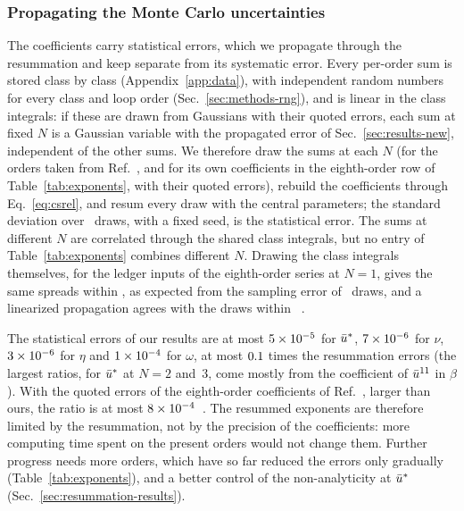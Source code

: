 \subsubsection{Propagating the Monte Carlo uncertainties}
\label{sec:resummation-errors}

The coefficients carry statistical errors, which we propagate through the resummation and keep separate from its
systematic error. Every per-order sum is stored class by class (Appendix~\ref{app:data}), with independent random
numbers for every class and loop order (Sec.~\ref{sec:methods-rng}), and is linear in the class integrals: if these
are drawn from Gaussians with their quoted errors, each sum at fixed $N$ is a Gaussian variable with the propagated
error of Sec.~\ref{sec:results-new}, independent of the other sums. We therefore draw the sums at each $N$ (for the
orders taken from Ref.~\cite{Phi4tools2024}, and for its own coefficients in the eighth-order row of
Table~\ref{tab:exponents}, with their quoted errors), rebuild the coefficients through Eq.~\eqref{eq:csrel}, and resum
every draw with the central parameters; the standard deviation over \rsDraws\ draws, with a fixed seed, is the
statistical error. The sums at different $N$ are correlated through the shared class integrals, but no entry of
Table~\ref{tab:exponents} combines different $N$. Drawing the class integrals themselves, for the ledger inputs of the
eighth-order series at $N=1$, gives the same spreads within \rsClassDev, as expected from the sampling error of
\rsDraws\ draws, and a linearized propagation agrees with the draws within \rsLinDev~.

The statistical errors of our results are at most $5\times10^{-5}$ for $\bar u^*$, $7\times10^{-6}$ for
$\nu$, $3\times10^{-6}$ for $\eta$ and $1\times10^{-4}$ for $\omega$, at most $0.1$ times the resummation
errors (the largest ratios, for $\bar u^*$ at $N=2$ and~3, come mostly from the coefficient of $\bar u^{11}$ in
$\beta$). With the quoted errors of the eighth-order coefficients of Ref.~\cite{Phi4tools2024}, larger than ours, the
ratio is at most $8\times10^{-4}$~. The resummed exponents are therefore limited by the resummation, not
by the precision of the coefficients: more computing time spent on the present orders would not change them. Further
progress needs more orders, which have so far reduced the errors only gradually (Table~\ref{tab:exponents}), and a
better control of the non-analyticity at $\bar u^*$ (Sec.~\ref{sec:resummation-results}).

